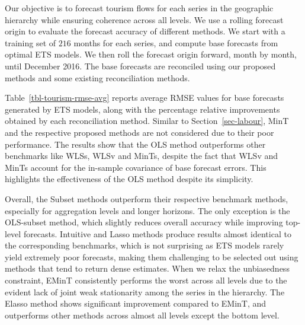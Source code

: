 \documentclass[
  11pt]{article}
\theoremstyle{plain}
\theoremstyle{remark}
\begin{document}
Our objective is to forecast tourism flows for each series in the
geographic hierarchy while ensuring coherence across all levels. We use
a rolling forecast origin to evaluate the forecast accuracy of different
methods. We start with a training set of \(216\) months for each series,
and compute base forecasts from optimal ETS models. We then roll the
forecast origin forward, month by month, until December 2016. The base
forecasts are reconciled using our proposed methods and some existing
reconciliation methods.

Table~\ref{tbl-tourism-rmse-avg} reports average RMSE values for base
forecasts generated by ETS models, along with the percentage relative
improvements obtained by each reconciliation method. Similar to
Section~\ref{sec-labour}, MinT and the respective proposed methods are
not considered due to their poor performance. The results show that the
OLS method outperforms other benchmarks like WLSs, WLSv and MinTs,
despite the fact that WLSv and MinTs account for the in-sample
covariance of base forecast errors. This highlights the effectiveness of
the OLS method despite its simplicity.

Overall, the Subset methods outperform their respective benchmark
methods, especially for aggregation levels and longer horizons. The only
exception is the OLS-subset method, which slightly reduces overall
accuracy while improving top-level forecasts. Intuitive and Lasso
methods produce results almost identical to the corresponding
benchmarks, which is not surprising as ETS models rarely yield extremely
poor forecasts, making them challenging to be selected out using methods
that tend to return dense estimates. When we relax the unbiasedness
constraint, EMinT consistently performs the worst across all levels due
to the evident lack of joint weak stationarity among the series in the
hierarchy. The Elasso method shows significant improvement compared to
EMinT, and outperforms other methods across almost all levels except the
bottom level.
\end{document}
